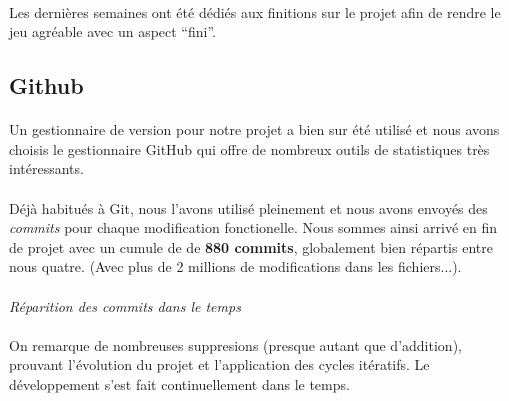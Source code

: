 \paragraph{}
Les dernières semaines ont été dédiés aux finitions sur le projet afin de rendre le jeu agréable avec un aspect “fini”.

\subsection{Github}

\paragraph{}
Un gestionnaire de version pour notre projet a bien sur été utilisé et nous avons choisis le gestionnaire GitHub qui offre de nombreux outils de statistiques très intéressants.

\paragraph{}
Déjà habitués à Git, nous l'avons utilisé pleinement et nous avons envoyés des \emph{commits} pour chaque modification fonctionelle. Nous sommes ainsi arrivé en fin de projet avec un cumule de de \textbf{880 commits}, globalement bien répartis entre nous quatre. (Avec plus de 2 millions de modifications dans les fichiers...).

\paragraph{}
\noindent
{}
\begin{center}
\textit{Réparition des commits dans le temps}
\end{center}

\paragraph{}
On remarque de nombreuses suppresions (presque autant que d’addition), prouvant l’évolution du projet et l’application des cycles itératifs. Le développement s’est fait continuellement dans le temps.

